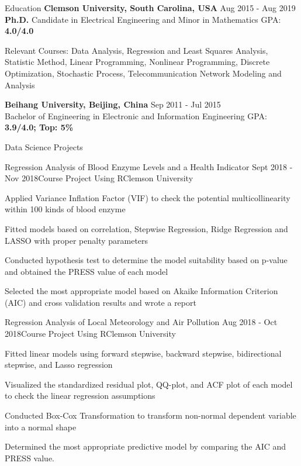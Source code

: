 \documentclass{resume} %
\begin{document}
\begin{rSection}{Education}
{\bf Clemson University, South Carolina, USA} \hfill { Aug 2015 - Aug 2019} \\ 
{\textbf{Ph.D.} Candidate in Electrical Engineering and Minor in Mathematics} \hfill { GPA: \bf 4.0/4.0}


Relevant Courses: Data Analysis, Regression and Least Squares Analysis, Statistic Method, 
Linear Programming, Nonlinear Programming, Discrete Optimization, Stochastic Process, Telecommunication Network Modeling and Analysis


{\bf Beihang University, Beijing, China} \hfill { Sep 2011 - Jul 2015} \\ 
{ Bachelor of Engineering  in Electronic and Information Engineering} \hfill { GPA: \bf 3.9/4.0; Top: 5\%}

\end{rSection}


\begin{rSection}{Data Science Projects}	
	\begin{rSubsection}{Regression Analysis of Blood Enzyme Levels and a Health Indicator}
		{Sept 2018 - Nov 2018}{Course Project Using R}{Clemson University}		
		\setlength{\parindent}{2em} \item Applied Variance Inflation Factor (VIF) to check the potential multicollinearity within 100 kinds of blood enzyme		
		\item Fitted models based on correlation, Stepwise Regression, Ridge Regression and LASSO with proper penalty parameters
		\item Conducted hypothesis test to determine the model suitability based on p-value and obtained the PRESS value of each model
		\item Selected the most appropriate model based on Akaike Information Criterion (AIC) and cross validation results and wrote a report		
	\end{rSubsection}	
	
		\begin{rSubsection}{Regression Analysis of Local Meteorology and Air Pollution}
			{Aug 2018 - Oct 2018}{Course Project Using R}{Clemson University}		
			\setlength{\parindent}{2em} \item Fitted linear models using forward stepwise, backward stepwise, bidirectional stepwise, and Lasso regression
			\item Visualized the standardized residual plot, QQ-plot, and ACF plot of each model to check the linear regression assumptions
			\item Conducted Box-Cox Transformation to transform non-normal dependent variable into a normal shape
			\item Determined the most appropriate predictive model by comparing the AIC and PRESS value.				
		\end{rSubsection}	
\end{rSection}
\end{document}
